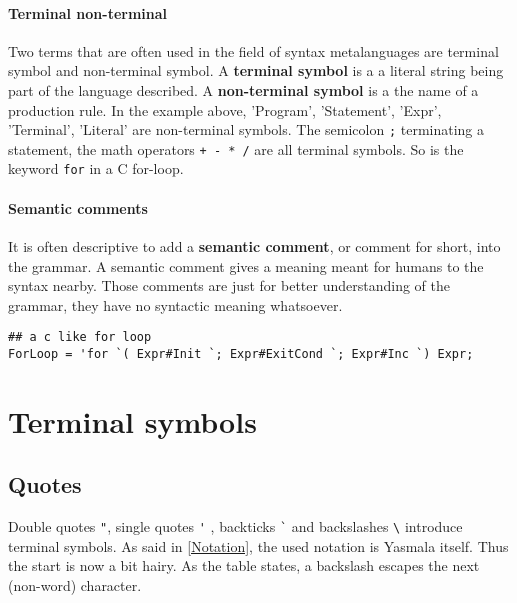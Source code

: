 \documentclass[a4paper]{report}
\begin{document}
\subsubsection{Terminal non-terminal}
Two terms that are often used in the field of syntax metalanguages are terminal
symbol and non-terminal symbol. A \textbf{terminal symbol} is a a literal string
being part of the language described. A \textbf{non-terminal symbol} is a the
name of a production rule. In the example above, 'Program', 'Statement', 'Expr',
'Terminal', 'Literal' are non-terminal symbols. The semicolon \verb|;|
terminating a statement, the math operators \verb|+ - * /| are all terminal
symbols. So is the keyword \verb|for| in a C for-loop. \subsubsection{Semantic
comments} It is often descriptive to add a \textbf{semantic comment}, or comment
for short, into the grammar. A semantic comment gives a meaning meant for humans
to the syntax nearby. Those comments are just for better understanding of the
grammar, they have no syntactic meaning whatsoever. 
\begin{verbatim}
## a c like for loop
ForLoop = 'for `( Expr#Init `; Expr#ExitCond `; Expr#Inc `) Expr;
\end{verbatim}




\chapter{Terminal symbols}

\section{Quotes}
Double quotes \verb|"|, single quotes \verb|'| , backticks \verb|`| and
backslashes \verb|\| introduce terminal symbols. As said in \ref{Notation}, the
used notation is Yasmala itself. Thus the start is now a bit hairy. As the table
states, a backslash escapes the next (non-word) character.
\end{document}
